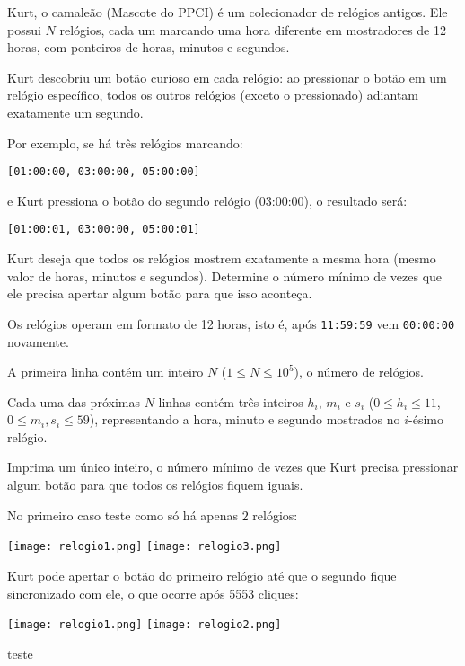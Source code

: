 Kurt, o camaleão (Mascote do PPCI) é um colecionador de relógios antigos. Ele possui $N$ relógios, cada um marcando uma hora diferente em mostradores de 12 horas, com ponteiros de horas, minutos e segundos. 

Kurt descobriu um botão curioso em cada relógio: ao pressionar o botão em um relógio específico, todos os outros relógios (exceto o pressionado) adiantam exatamente um segundo. 

Por exemplo, se há três relógios marcando:

\begin{center}
\texttt{[01:00:00, 03:00:00, 05:00:00]}
\end{center}
e Kurt pressiona o botão do segundo relógio (03:00:00), o resultado será:
\begin{center}
\texttt{[01:00:01, 03:00:00, 05:00:01]}
\end{center}

Kurt deseja que todos os relógios mostrem exatamente a mesma hora (mesmo valor de horas, minutos e segundos).  
Determine o número mínimo de vezes que ele precisa apertar algum botão para que isso aconteça.

Os relógios operam em formato de 12 horas, isto é, após \texttt{11:59:59} vem \texttt{00:00:00} novamente.

A primeira linha contém um inteiro $N$ ($1 \leq N \leq 10^5$), o número de relógios.  

Cada uma das próximas $N$ linhas contém três inteiros $h_i$, $m_i$ e $s_i$ ($0 \le h_i \le 11$, $0 \le m_i, s_i \le 59$), representando a hora, minuto e segundo mostrados no $i$-ésimo relógio.

Imprima um único inteiro, o número mínimo de vezes que Kurt precisa pressionar algum botão para que todos os relógios fiquem iguais.

No primeiro caso teste como só há apenas $2$ relógios: 

\texttt{[image: relogio1.png]}
\texttt{[image: relogio3.png]}

Kurt pode apertar o botão do primeiro relógio até que o segundo fique sincronizado com ele, o que ocorre após 5553 cliques:

\texttt{[image: relogio1.png]}
\texttt{[image: relogio2.png]}

teste
